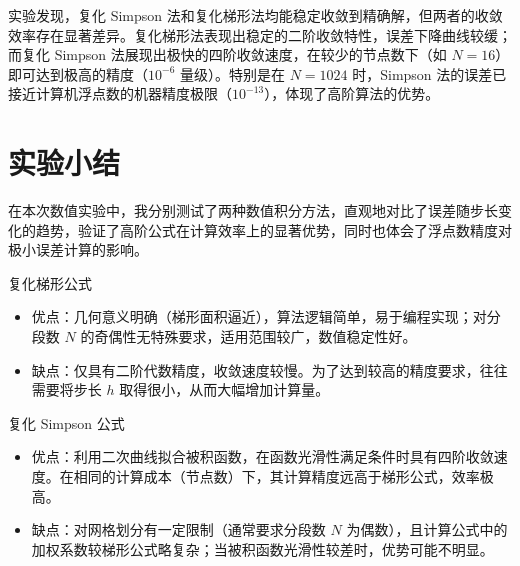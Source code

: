\documentclass[UTF8]{ctexart}
\begin{document}
实验发现，复化 Simpson 法和复化梯形法均能稳定收敛到精确解，但两者的收敛效率存在显著差异。复化梯形法表现出稳定的二阶收敛特性，误差下降曲线较缓；而复化 Simpson 法展现出极快的四阶收敛速度，在较少的节点数下（如 $N=16$）即可达到极高的精度（$10^{-6}$ 量级）。特别是在 $N=1024$ 时，Simpson 法的误差已接近计算机浮点数的机器精度极限（$10^{-13}$），体现了高阶算法的优势。

\section{实验小结}
在本次数值实验中，我分别测试了两种数值积分方法，直观地对比了误差随步长变化的趋势，验证了高阶公式在计算效率上的显著优势，同时也体会了浮点数精度对极小误差计算的影响。

复化梯形公式
\begin{itemize}
	\item 优点：几何意义明确（梯形面积逼近），算法逻辑简单，易于编程实现；对分段数 $N$ 的奇偶性无特殊要求，适用范围较广，数值稳定性好。
	\item 缺点：仅具有二阶代数精度，收敛速度较慢。为了达到较高的精度要求，往往需要将步长 $h$ 取得很小，从而大幅增加计算量。
\end{itemize}

复化 Simpson 公式
\begin{itemize}
	\item 优点：利用二次曲线拟合被积函数，在函数光滑性满足条件时具有四阶收敛速度。在相同的计算成本（节点数）下，其计算精度远高于梯形公式，效率极高。
	\item 缺点：对网格划分有一定限制（通常要求分段数 $N$ 为偶数），且计算公式中的加权系数较梯形公式略复杂；当被积函数光滑性较差时，优势可能不明显。
\end{itemize}
\end{document}
